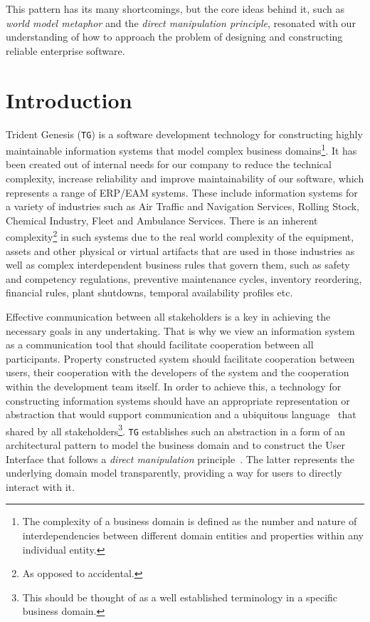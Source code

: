 \documentclass[a4paper,10pt,oneside,openright,final]{memoir} %
\begin{document}
    This pattern has its many shortcomings, but the core ideas behind it, such as \emph{world model metaphor} and the \emph{direct manipulation principle}, resonated with our understanding of how to approach the problem of designing and constructing reliable enterprise software.
        
    
\section*{Introduction}
    
	Trident Genesis (\texttt{TG}) is a software development technology for constructing highly maintainable information systems that model complex business domains\footnote{The complexity of a business domain is defined as the number and nature of interdependencies between different domain entities and properties within any individual entity.}.
	It has been created out of internal needs for our company to reduce the technical complexity, increase reliability and improve maintainability of our software, which represents a range of ERP/EAM systems.
	These include information systems for a variety of industries such as Air Traffic and Navigation Services, Rolling Stock, Chemical Industry, Fleet and Ambulance Services.
	There is an inherent complexity\footnote{As opposed to accidental.} in such systems due to the real world complexity of the equipment, assets and other physical or virtual artifacts that are used in those industries as well as complex interdependent business rules that govern them, such as safety and competency regulations, preventive maintenance cycles, inventory reordering, financial rules, plant shutdowns, temporal availability profiles etc.
	
	Effective communication between all stakeholders is a key in achieving the necessary goals in any undertaking.
	That is why we view an information system as a communication tool that should facilitate cooperation between all participants. 
	Property constructed system should facilitate cooperation between users, their cooperation with the developers of the system and the cooperation within the development team itself.
	In order to achieve this, a technology for constructing information systems should have an appropriate representation or abstraction that would support communication and a ubiquitous language~\cite{evans2003} that shared by all stakeholders\footnote{This should be thought of as a well established terminology in a specific business domain.}.
	\texttt{TG} establishes such an abstraction in a form of an architectural pattern to model the business domain and to construct the User Interface that follows a \emph{direct manipulation} principle~\cite{shneiderman1982, shneiderman1983}.
	The latter represents the underlying domain model transparently, providing a way for users to directly interact with it.
\end{document}
